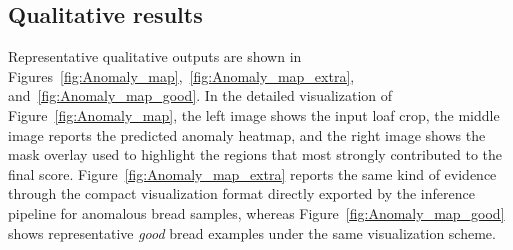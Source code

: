 \subsection{Qualitative results}
Representative qualitative outputs are shown in Figures~\ref{fig:Anomaly_map},~\ref{fig:Anomaly_map_extra}, and~\ref{fig:Anomaly_map_good}. In the detailed visualization of Figure~\ref{fig:Anomaly_map}, the left image shows the input loaf crop, the middle image reports the predicted anomaly heatmap, and the right image shows the mask overlay used to highlight the regions that most strongly contributed to the final score. Figure~\ref{fig:Anomaly_map_extra} reports the same kind of evidence through the compact visualization format directly exported by the inference pipeline for anomalous bread samples, whereas Figure~\ref{fig:Anomaly_map_good} shows representative \emph{good} bread examples under the same visualization scheme.

